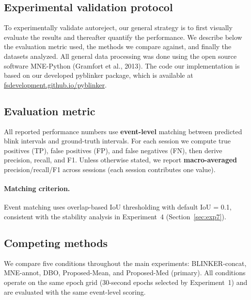 \subsection{Experimental validation protocol}

To experimentally validate autoreject, our general strategy is to first visually evaluate the
results and thereafter quantify the performance. We describe below the evaluation metric
used, the methods we compare against, and finally the datasets analyzed. All general data
processing was done using the open source software MNE-Python (Gramfort et al., 2013). The code our implementation is based on our developed pyblinker package, which is available at \url{fsdevelopment.github.io/pyblinker}.

\subsection{Evaluation metric}
\label{sec:eval_metric_protocol}

All reported performance numbers use \textbf{event-level} matching between predicted blink
intervals and ground-truth intervals. For each session we compute true positives (TP),
false positives (FP), and false negatives (FN), then derive precision, recall, and F1.
Unless otherwise stated, we report \textbf{macro-averaged} precision/recall/F1 across
sessions (each session contributes one value).

\paragraph{Matching criterion.}
Event matching uses overlap-based IoU thresholding with default IoU = 0.1, consistent with
the stability analysis in Experiment~4 (Section~\ref{sec:exp7}).

\subsection{Competing methods}
\label{sec:competing_methods_protocol}

We compare five conditions throughout the main experiments:
BLINKER-concat, MNE-annot, DBO, Proposed-Mean, and Proposed-Med (primary).
All conditions operate on the same epoch grid (30-second epochs selected by Experiment~1)
and are evaluated with the same event-level scoring.
